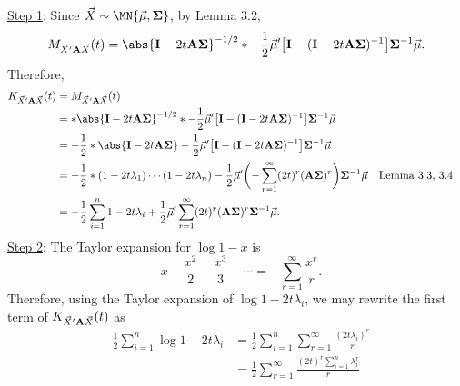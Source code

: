 \begin{Theorem}{}{}
    \underline{Step 1}:
    Since $ \Vector{X}\sim \MN{\Vector{\mu},\Matrix{\Sigma}} $,
    by Lemma 3.2,
    \[ M_{\Vector{X}'\Matrix{A}\Vector{X}}(t)
        =\abs{\Matrix{I}-2t \Matrix{A}\Matrix{\Sigma}}^{-1/2}
        \exp*{-\frac{1}{2}\Vector{\mu}'\bigl[\Matrix{I}-(\Matrix{I}-2t \Matrix{A}\Matrix{\Sigma})^{-1}\bigr]\Matrix{\Sigma}^{-1}\Vector{\mu}}. \]
    Therefore,
    \begin{align*}
        K_{\Vector{X}'\Matrix{A}\Vector{X}}(t)
         & =\log{M_{\Vector{X}'\Matrix{A}\Vector{X}}(t)}                                                                                                                                                                              \\
         & =\log*{\abs{\Matrix{I}-2t \Matrix{A}\Matrix{\Sigma}}^{-1/2}
        \exp*{-\frac{1}{2}\Vector{\mu}'\bigl[\Matrix{I}-(\Matrix{I}-2t \Matrix{A}\Matrix{\Sigma})^{-1}\bigr]\Matrix{\Sigma}^{-1}\Vector{\mu}}}                                                                                        \\
         & =-\frac{1}{2}\log*{\abs{\Matrix{I}-2t \Matrix{A}\Matrix{\Sigma}}}-\frac{1}{2}\Vector{\mu}'\bigl[\Matrix{I}-(\Matrix{I}-2t \Matrix{A}\Matrix{\Sigma})^{-1}\bigr]\Matrix{\Sigma}^{-1}\Vector{\mu}                            \\
         & =-\frac{1}{2}\log*{(1-2t\lambda_1)\cdots(1-2t\lambda_n)}-\frac{1}{2}\Vector{\mu}'\biggl(-\sum_{r=1}^{\infty}(2t)^r(\Matrix{A\Sigma})^r\biggr)\Matrix{\Sigma}^{-1}\Vector{\mu}                   &  & \text{Lemma 3.3, 3.4} \\
         & =-\frac{1}{2}\sum_{i=1}^{n}\log{1-2t\lambda_i}+\frac{1}{2}\Vector{\mu}' \sum_{r=1}^{\infty}(2t)^r(\Matrix{A\Sigma})^r \Matrix{\Sigma}^{-1}\Vector{\mu}.
    \end{align*}
    \underline{Step 2}: The Taylor expansion for $ \log{1-x} $ is
    \[ -x-\frac{x^2}{2}-\frac{x^3}{3}-\cdots=-\sum_{r=1}^{\infty}\frac{x^r}{r}. \]
    Therefore, using the Taylor expansion of $ \log{1-2t\lambda_i} $, we may rewrite
    the first term of $ K_{\vec{X}'\mathbf{A}\vec{X}}(t) $ as
    \begin{align*}
        -\frac{1}{2}\sum_{i=1}^{n}\log{1-2t\lambda_i}
         & =\frac{1}{2}\sum_{i=1}^{n}
        \sum_{r=1}^{\infty}\frac{(2t\lambda_i)^r}{r}                                                                                           \\
         & =\frac{1}{2}\sum_{r=1}^{\infty}\frac{(2t)^r \sum_{i=1}^{n}\lambda_i^r}{r}                                                           \\

\end{align*}
\end{Theorem}
